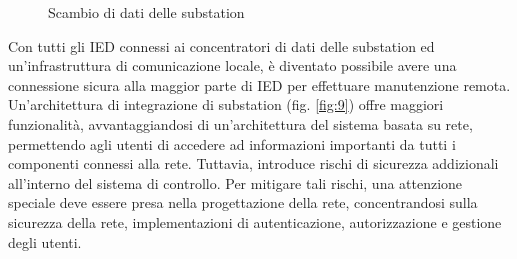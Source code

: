 \begin{figure}[h] 
\caption{Scambio di dati delle substation}\label{fig:8}
\end{figure}

Con tutti gli IED connessi ai concentratori di dati delle substation ed un'infrastruttura di comunicazione locale, è diventato possibile avere una connessione  sicura alla maggior parte di IED per effettuare manutenzione remota.
\newline 
Un'architettura di integrazione di substation (fig. \ref{fig:9}) offre maggiori funzionalità, avvantaggiandosi di un'architettura del sistema basata su rete, permettendo agli utenti di accedere ad informazioni importanti da tutti i componenti connessi alla rete. Tuttavia, introduce rischi di sicurezza addizionali all'interno del sistema di controllo. Per mitigare tali rischi, una attenzione speciale deve essere presa nella progettazione della rete, concentrandosi sulla sicurezza della rete, implementazioni di autenticazione, autorizzazione e gestione degli utenti. 
 
